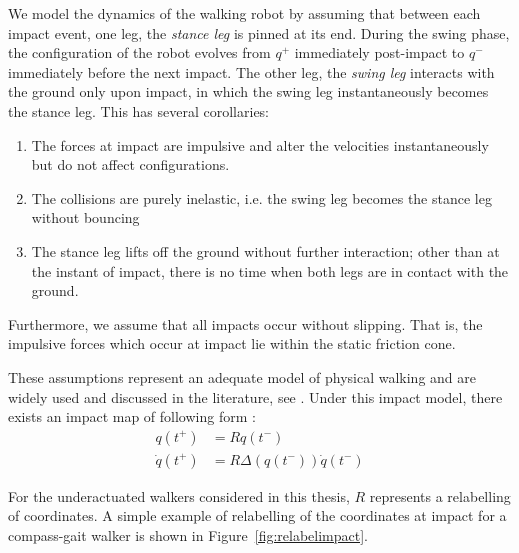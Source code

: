 We model the dynamics of the walking robot by assuming that between each impact event, one leg, the \textit{stance leg} is pinned at its end. During the swing phase, the configuration of the robot evolves from $q^+$ immediately post-impact to $q^-$ immediately before the next impact. The other leg, the \textit{swing leg} interacts with the ground only upon impact, in which the swing leg instantaneously becomes the stance leg. This has several corollaries:
\begin{enumerate}[parsep=0cm]
	\item The forces at impact are impulsive and alter the velocities instantaneously but do not affect configurations.
	\item The collisions are purely inelastic, i.e. the swing leg becomes the stance leg without bouncing
	\item The stance leg lifts off the ground without further interaction; other than at the instant of impact, there is no time when both legs are in contact with the ground.
\end{enumerate}
Furthermore, we assume that all impacts occur without slipping. That is, the impulsive forces which occur at impact lie within the static friction cone. 

These assumptions represent an adequate model of physical walking and are widely used and discussed in the literature, see \cite{hurmuzlu1994rigid, westervelt2007feedback}. Under this impact model, there exists an impact map of following form \cite{manchester13planning}:
\begin{subequations} \label{eqn:impact}
\begin{align}
	q\left(t^+\right) &= Rq\left(t^-\right) \label{eqn:impactconfig}\\
	\dot{q}\left(t^+\right) &= R\Delta\left(q\left(t^-\right)\right)\dot{q}\left(t^-\right) \label{eqn:impactvel}
\end{align}
\end{subequations} %

For the underactuated walkers considered in this thesis, $R$ represents a relabelling of coordinates. A simple example of relabelling of the coordinates at impact for a compass-gait walker is shown in Figure~\ref{fig:relabelimpact}.


